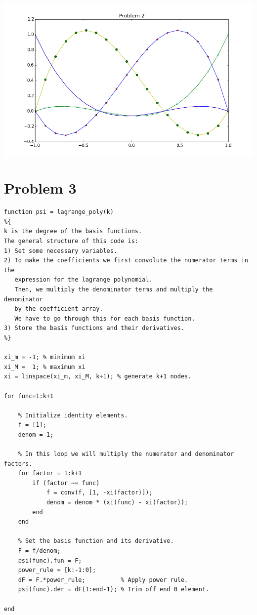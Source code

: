 \documentclass[10pt]{article}
\begin{document}
\begin{center}
\includegraphics[scale = 0.7]{prob2.png}
\end{center}

\section*{Problem 3}

\begin{lstlisting}
function psi = lagrange_poly(k)
%{
k is the degree of the basis functions.
The general structure of this code is:
1) Set some necessary variables.
2) To make the coefficients we first convolute the numerator terms in the 
   expression for the lagrange polynomial.
   Then, we multiply the denominator terms and multiply the denominator
   by the coefficient array. 
   We have to go through this for each basis function.
3) Store the basis functions and their derivatives.
%}

xi_m = -1; % minimum xi
xi_M =  1; % maximum xi
xi = linspace(xi_m, xi_M, k+1); % generate k+1 nodes.

for func=1:k+1
    
    % Initialize identity elements.
    f = [1];
    denom = 1;
    
    % In this loop we will multiply the numerator and denominator factors.
    for factor = 1:k+1
        if (factor ~= func)
            f = conv(f, [1, -xi(factor)]);
            denom = denom * (xi(func) - xi(factor)); 
        end
    end
    
    % Set the basis function and its derivative.
    F = f/denom;
    psi(func).fun = F;
    power_rule = [k:-1:0];
    dF = F.*power_rule;          % Apply power rule.
    psi(func).der = dF(1:end-1); % Trim off end 0 element.

end
\end{lstlisting}
\end{document}
